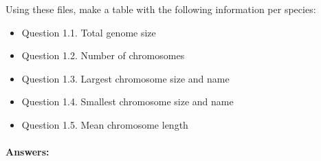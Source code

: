 \documentclass[]{article}
\providecommand{\tightlist}{%
  \setlength{\itemsep}{0pt}\setlength{\parskip}{0pt}}
\let\oldparagraph\paragraph
\renewcommand{\paragraph}[1]{\oldparagraph{#1}\mbox{}}
\begin{document}
Using these files, make a table with the following information per
species:

\begin{itemize}
\tightlist
\item
  Question 1.1. Total genome size
\item
  Question 1.2. Number of chromosomes
\item
  Question 1.3. Largest chromosome size and name
\item
  Question 1.4. Smallest chromosome size and name
\item
  Question 1.5. Mean chromosome length
\end{itemize}

\paragraph{Answers:}\label{answers}
\end{document}

